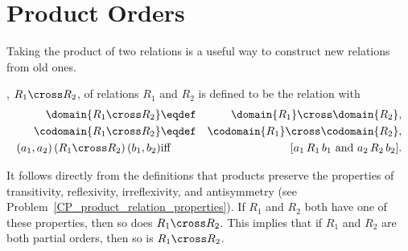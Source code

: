 \begin{problems}
\practiceproblems
{}

\classproblems
{}

\homeworkproblems
{}

\examproblems
{}

\end{problems}


\section{Product Orders}\label{prodsec}

Taking the product of two relations is a useful way to construct new
relations from old ones.

\begin{definition}\label{productrel}
, $R_1 \cross R_2$, of relations
$R_1$ and $R_2$ is defined to be the relation with
\begin{eqnarray*}
\domain{R_1 \cross R_2} &\eqdef& \domain{R_1} \cross \domain{R_2},\\
\codomain{R_1 \cross R_2} &\eqdef& \codomain{R_1} \cross \codomain{R_2},\\
(a_1,a_2)\, (R_1 \cross R_2)\, (b_1,b_2) &\text{iff}& [a_1\, R_1\, b_1
\text{ and } a_2\, R_2\, b_2].
\end{eqnarray*}

\end{definition}

It follows directly from the definitions that products preserve the
properties of transitivity, reflexivity, irreflexivity, and
antisymmetry (see Problem~\ref{CP_product_relation_properties}).  If
$R_1$ and $R_2$ both have one of these properties, then so does $R_1
\cross R_2$.  This implies that if $R_1$ and $R_2$ are both partial
orders, then so is $R_1 \cross R_2$.

